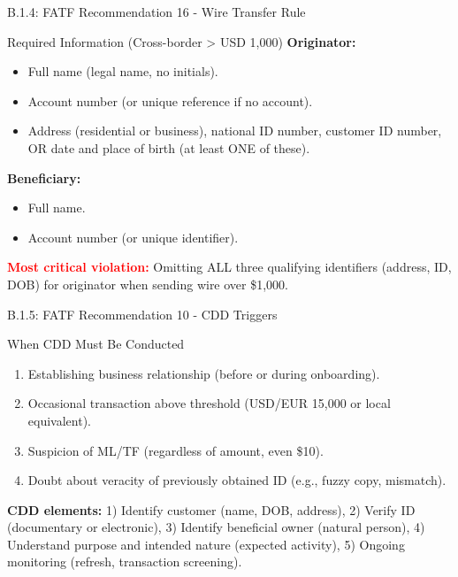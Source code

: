 \documentclass{beamer}
\begin{document}
	\begin{frame}{B.1.4: FATF Recommendation 16 - Wire Transfer Rule}
		\begin{block}{Required Information (Cross-border > USD 1,000)}
			\textbf{Originator:}
			\begin{itemize}
				\item Full name (legal name, no initials).
				\item Account number (or unique reference if no account).
				\item Address (residential or business), national ID number, customer ID number, OR date and place of birth (at least ONE of these).
			\end{itemize}
			\textbf{Beneficiary:}
			\begin{itemize}
				\item Full name.
				\item Account number (or unique identifier).
			\end{itemize}
		\end{block}
		\textcolor{red}{\textbf{Most critical violation:}} Omitting ALL three qualifying identifiers (address, ID, DOB) for originator when sending wire over \$1,000.
	\end{frame}
	
	\begin{frame}{B.1.5: FATF Recommendation 10 - CDD Triggers}
		\begin{block}{When CDD Must Be Conducted}
			\begin{enumerate}
				\item Establishing business relationship (before or during onboarding).
				\item Occasional transaction above threshold (USD/EUR 15,000 or local equivalent).
				\item Suspicion of ML/TF (regardless of amount, even \$10).
				\item Doubt about veracity of previously obtained ID (e.g., fuzzy copy, mismatch).
			\end{enumerate}
		\end{block}
		\textbf{CDD elements:} 1) Identify customer (name, DOB, address), 2) Verify ID (documentary or electronic), 3) Identify beneficial owner (natural person), 4) Understand purpose and intended nature (expected activity), 5) Ongoing monitoring (refresh, transaction screening).
	\end{frame}
	
\end{document}
